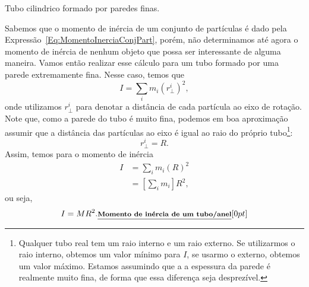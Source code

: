 \begin{marginfigure}
\centering
{}
\caption{Tubo cilindrico formado por paredes finas. \label{Fig:MomInerciaTubo}}
\end{marginfigure}

Sabemos que o momento de inércia de um conjunto de partículas é dado pela Expressão~\eqref{Eq:MomentoInerciaConjPart}, porém, não determinamos até agora o momento de inércia de nenhum objeto que possa ser interessante de alguma maneira. Vamos então realizar esse cálculo para um tubo formado por uma parede extremamente fina. Nesse caso, temos que
\begin{equation}
    I = \sum_i m_i (r_\perp^i)^2,
\end{equation}
%
onde utilizamos $r_\perp^i$ para denotar a distância de cada partícula ao eixo de rotação. Note que, como a parede do tubo é muito fina, podemos em boa aproximação assumir que a distância das partículas ao eixo é igual ao raio do próprio tubo\footnote{Qualquer tubo real tem um raio interno e um raio externo. Se utilizarmos o raio interno, obtemos um valor mínimo para $I$, se usarmo o externo, obtemos um valor máximo. Estamos assumindo que a a espessura da parede é realmente muito fina, de forma que essa diferença seja desprezível.}:
\begin{equation}
    r_\perp^i = R.
\end{equation}
%
Assim, temos para o momento de inércia
\begin{align}
    I &= \sum_i m_i (R)^2 \\
    &= \left[\sum_i m_i\right] R^2,
\end{align}
%
ou seja,
\begin{equation}
    I = MR^2. \relax{\footnotesize\emph{\textbf{Momento de inércia de um tubo/anel}}}[0pt]
\end{equation}

